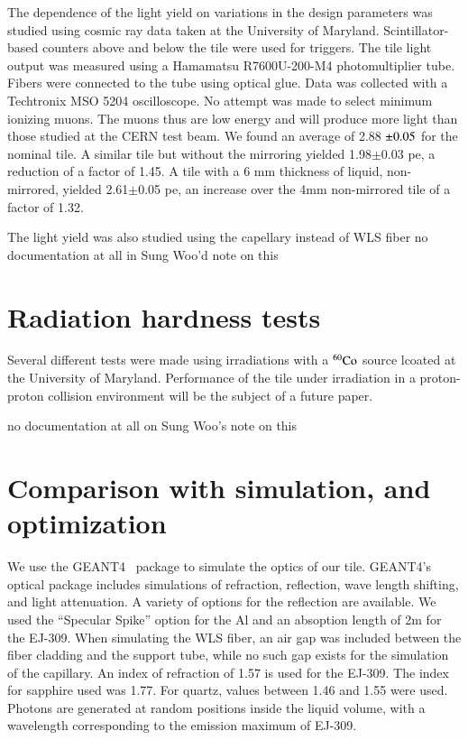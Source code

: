 \documentclass[review]{elsarticle}
\begin{document}
The dependence of the light yield on variations in the design parameters was studied using cosmic ray data taken at the University of Maryland.  Scintillator-based counters above and below the tile were used for triggers.  The tile light output was measured using a Hamamatsu R7600U-200-M4 photomultiplier tube.  Fibers were connected to the tube using optical glue.  Data was collected with a Techtronix MSO 5204 oscilloscope.  No attempt was made to select
minimum ionizing muons.  The muons thus are low energy and will produce more light than those studied at the CERN test beam.  We found an average of 2.88 ${\rm \pm } 0.05$ for the nominal tile.  A similar tile but without the mirroring yielded 1.98${\pm} 0.03$ pe, a reduction of a factor of 1.45.  A tile with a 6 mm thickness of liquid, non-mirrored, yielded 2.61${\pm }$0.05 pe, an increase over the 4mm non-mirrored tile of a factor of 1.32.

The light yield was also studied using the capellary instead of WLS fiber {\color{red} no documentation at all in Sung Woo'd note on this}

\section{Radiation hardness tests}

Several different tests were made using irradiations with a $\rm{^{60}Co}$ source lcoated at the University of Maryland.  Performance of the tile under irradiation in a proton-proton collision environment will be the subject of a future paper.


{\color{red} no documentation at all on Sung Woo's note on this}

\section{Comparison with simulation, and optimization}
We use the GEANT4~\cite{Agostinelli2003250} package to simulate the optics of our tile.  GEANT4's optical package includes simulations of refraction, reflection, wave length shifting, and light attenuation.  A variety of options for the reflection are available.  We used the ``Specular Spike'' option for the Al and an absoption length of 2m for the EJ-309.  When simulating the WLS fiber, an air gap was included between the fiber cladding and the support tube, while no such gap exists for the simulation of the capillary. An index of refraction of 1.57 is used for the EJ-309.  The index for sapphire used was 1.77.  For quartz, values between 1.46 and 1.55 were used.
Photons are generated at random positions inside the liquid volume, with a wavelength corresponding to the emission maximum of EJ-309.  
\end{document}
